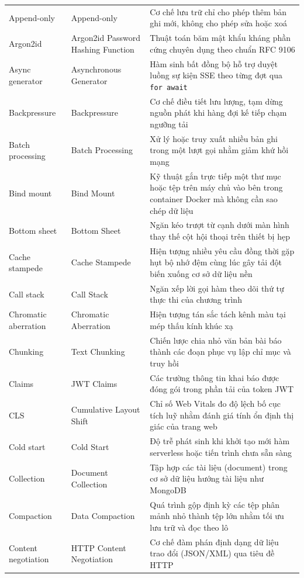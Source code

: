 {\begin{longtable}{@{}>{\raggedright\arraybackslash}p{3.4cm}>{\raggedright\arraybackslash}p{4.7cm}>{\raggedright\arraybackslash}p{7.15cm}@{}}
    Append-only & Append-only & Cơ chế lưu trữ chỉ cho phép thêm bản ghi mới, không cho phép sửa hoặc xoá \\
    Argon2id & Argon2id Password Hashing Function & Thuật toán băm mật khẩu kháng phần cứng chuyên dụng theo chuẩn RFC 9106 \\
    Async generator & Asynchronous Generator & Hàm sinh bất đồng bộ hỗ trợ duyệt luồng sự kiện SSE theo từng đợt qua \texttt{for await} \\
    Backpressure & Backpressure & Cơ chế điều tiết lưu lượng, tạm dừng nguồn phát khi hàng đợi kế tiếp chạm ngưỡng tải \\
    Batch processing & Batch Processing & Xử lý hoặc truy xuất nhiều bản ghi trong một lượt gọi nhằm giảm khứ hồi mạng \\
    Bind mount & Bind Mount & Kỹ thuật gắn trực tiếp một thư mục hoặc tệp trên máy chủ vào bên trong container Docker mà không cần sao chép dữ liệu \\
    Bottom sheet & Bottom Sheet & Ngăn kéo trượt từ cạnh dưới màn hình thay thế cột hội thoại trên thiết bị hẹp \\
    Cache stampede & Cache Stampede & Hiện tượng nhiều yêu cầu đồng thời gặp hụt bộ nhớ đệm cùng lúc gây tải đột biến xuống cơ sở dữ liệu nền \\
    Call stack & Call Stack & Ngăn xếp lời gọi hàm theo dõi thứ tự thực thi của chương trình \\
    Chromatic aberration & Chromatic Aberration & Hiện tượng tán sắc tách kênh màu tại mép thấu kính khúc xạ \\
    Chunking & Text Chunking & Chiến lược chia nhỏ văn bản bài báo thành các đoạn phục vụ lập chỉ mục và truy hồi \\
    Claims & JWT Claims & Các trường thông tin khai báo được đóng gói trong phần tải của token JWT \\
    CLS & Cumulative Layout Shift & Chỉ số Web Vitals đo độ lệch bố cục tích luỹ nhằm đánh giá tính ổn định thị giác của trang web \\
    Cold start & Cold Start & Độ trễ phát sinh khi khởi tạo mới hàm serverless hoặc tiến trình chưa sẵn sàng \\
    Collection & Document Collection & Tập hợp các tài liệu (document) trong cơ sở dữ liệu hướng tài liệu như MongoDB \\
    Compaction & Data Compaction & Quá trình gộp định kỳ các tệp phân mảnh nhỏ thành tệp lớn nhằm tối ưu lưu trữ và đọc theo lô \\
    Content negotiation & HTTP Content Negotiation & Cơ chế đàm phán định dạng dữ liệu trao đổi (JSON/XML) qua tiêu đề HTTP \\

\end{longtable}}
